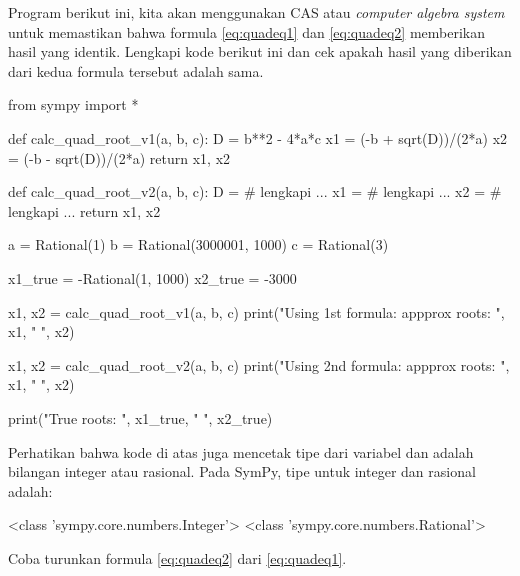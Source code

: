 \begin{soal}
Program berikut ini, kita akan menggunakan CAS atau \textit{computer algebra system}
untuk memastikan bahwa formula \eqref{eq:quadeq1} dan \eqref{eq:quadeq2} memberikan
hasil yang identik. Lengkapi kode berikut ini dan cek apakah hasil yang diberikan
dari kedua formula tersebut adalah sama.
\begin{pythoncode}
from sympy import *

def calc_quad_root_v1(a, b, c):
  D = b**2 - 4*a*c
  x1 = (-b + sqrt(D))/(2*a)
  x2 = (-b - sqrt(D))/(2*a)
  return x1, x2
  
def calc_quad_root_v2(a, b, c):
  D = # lengkapi ...
  x1 = # lengkapi ...
  x2 = # lengkapi ... 
  return x1, x2
  
a = Rational(1)
b = Rational(3000001, 1000)
c = Rational(3)
  
x1_true = -Rational(1, 1000)
x2_true = -3000
  
x1, x2 = calc_quad_root_v1(a, b, c)
print("Using 1st formula: appprox roots: ", x1, " ", x2)

x1, x2 = calc_quad_root_v2(a, b, c)
print("Using 2nd formula: appprox roots: ", x1, " ", x2)

print("True roots: ", x1_true, " ", x2_true)
\end{pythoncode}
Perhatikan bahwa kode di atas juga mencetak tipe dari variabel  dan
 adalah bilangan integer atau rasional.
Pada SymPy, tipe untuk integer dan rasional adalah:
\begin{textcode}
<class 'sympy.core.numbers.Integer'> <class 'sympy.core.numbers.Rational'>
\end{textcode}
Coba turunkan formula \eqref{eq:quadeq2} dari \eqref{eq:quadeq1}.
\end{soal}